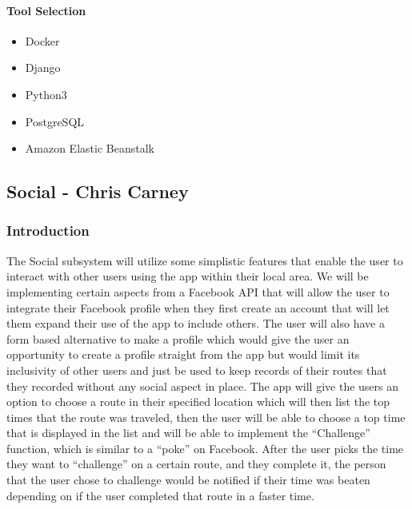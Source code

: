 ﻿\documentclass{article}
\begin{document}
\paragraph{Tool Selection}
\begin{itemize}
    \item Docker
    \item Django
    \item Python3
    \item PostgreSQL
    \item Amazon Elastic Beanstalk
\end{itemize}

\subsection{Social - Chris Carney}
\subsubsection{Introduction}
The Social subsystem will utilize some simplistic features that enable the user to interact with other users using the app within their local area. We will be implementing certain aspects from a Facebook API that will allow the user to integrate their Facebook profile when they first create an account that will let them expand their use of the app to include others. The user will also have a form based alternative to make a profile which would give the user an opportunity to create a profile straight from the app but would limit its inclusivity of other users and just be used to keep records of their routes that they recorded without any social aspect in place. 
The app will give the users an option to choose a route in their specified location which will then list the top times that the route was traveled, then the user will be able to choose a top time that is displayed in the list and will be able to implement the “Challenge” function, which is similar to a “poke” on Facebook. After the user picks the time they want to “challenge” on a certain route, and they complete it, the person that the user chose to challenge would be notified if their time was beaten depending on if the user completed that route in a faster time.
\end{document}
